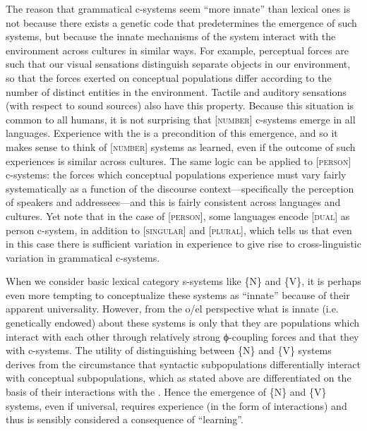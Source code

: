 The reason that grammatical c-systems seem “more innate” than lexical ones is not because there exists a genetic code that predetermines the emergence of such systems, but because the innate mechanisms of the system interact with the environment across cultures in similar ways. For example, perceptual  forces are such that our visual sensations distinguish separate objects in our environment, so that the  forces exerted on conceptual populations differ according to the number of distinct entities in the environment. Tactile and auditory sensations (with respect to sound sources) also have this property. Because this situation is common to all humans, it is not surprising that [\textsc{number}] c-systems emerge in all languages. Experience with the  is a precondition of this emergence, and so it makes sense to think of [\textsc{number}] systems as learned, even if the outcome of such experiences is similar across cultures. The same logic can be applied to [\textsc{person}] c-systems: the  forces which conceptual populations experience must vary fairly systematically as a function of the discourse context—specifically the perception of speakers and addressees—and this is fairly consistent across languages and cultures. Yet note that in the case of [\textsc{person}], some languages encode [\textsc{dual}] as person c-system, in addition to [\textsc{singular}] and [\textsc{plural}], which tells us that even in this case there is sufficient variation in experience to give rise to cross-linguistic variation in grammatical c-systems.

When we consider basic lexical category s-systems like \{N\} and \{V\}, it is perhaps even more tempting to conceptualize these systems as “innate” because of their apparent universality. However, from the o/el perspective what is innate (i.e. genetically endowed) about these systems is only that they are populations which interact with each other through relatively strong ϕ{}-coupling forces and that they  with c-systems. The utility of distinguishing between \{N\} and \{V\} systems derives from the circumstance that syntactic subpopulations differentially interact with conceptual subpopulations, which as stated above are differentiated on the basis of their interactions with the . Hence the emergence of \{N\} and \{V\} systems, even if universal, requires experience (in the form of  interactions) and thus is sensibly considered a consequence of “learning”. 

